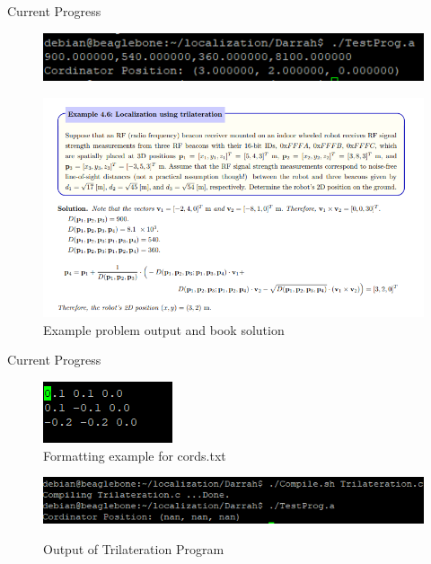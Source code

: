 \documentclass{beamer}
\begin{document}
\begin{frame}{Current Progress}
    \begin{figure}
    \centering
    \includegraphics[scale=0.64]{figs/ScreenShots/LocalizationTestOutput.PNG}
    \label{fig:LocalizationTestOutput}
    \end{figure}
    
    \begin{figure}
    \centering
    \includegraphics[scale=0.53]{figs/ScreenShots/MiahBookExample.PNG}
    \caption{Example problem output and book solution}
    \label{fig:BookExample1}
    \end{figure}
\end{frame}

\begin{frame}{Current Progress}
    \begin{figure}
    \centering
    \includegraphics[scale=0.8]{figs/ScreenShots/CordsTextDoc.PNG}
	\caption{Formatting example for cords.txt}    
    \label{fig:CordsFormating}
    \end{figure}
    
    \begin{figure}
    \centering
    \includegraphics[scale=0.8]{figs/ScreenShots/TrilaterationProgOutout.PNG}
    \label{fig:TrilaterationOutput}
    \caption{Output of Trilateration Program} 
    \end{figure}
\end{frame}
\end{document}
